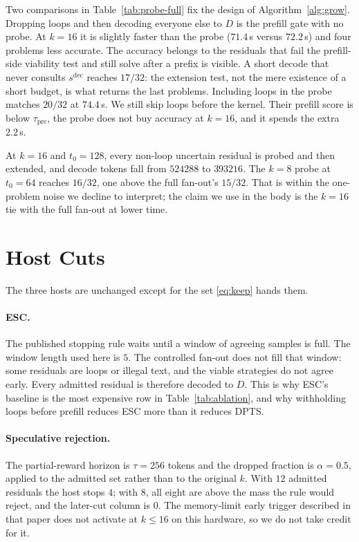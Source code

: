 Two comparisons in Table~\ref{tab:probe-full} fix the design of Algorithm~\ref{alg:grow}.
Dropping loops and then decoding everyone else to $D$ is the prefill gate with no probe.
At $k{=}16$ it is slightly faster than the probe ($71.4$\,s versus $72.2$\,s) and four problems less accurate.
The accuracy belongs to the residuals that fail the prefill-side viability test and still solve after a prefix is visible.
A short decode that never consults $s^{\mathrm{dec}}$ reaches $17/32$: the extension test, not the mere existence of a short budget, is what returns the last problems.
Including loops in the probe matches $20/32$ at $74.4$\,s.
We still skip loops before the kernel.
Their prefill score is below $\tau_{\mathrm{pre}}$, the probe does not buy accuracy at $k{=}16$, and it spends the extra $2.2$\,s.

At $k{=}16$ and $t_0{=}128$, every non-loop uncertain residual is probed and then extended, and decode tokens fall from $524288$ to $393216$.
The $k{=}8$ probe at $t_0{=}64$ reaches $16/32$, one above the full fan-out's $15/32$.
That is within the one-problem noise we decline to interpret; the claim we use in the body is the $k{=}16$ tie with the full fan-out at lower time.

\section{Host Cuts}
\label{app:hosts}

The three hosts are unchanged except for the set \eqref{eq:keep} hands them.

\paragraph{ESC.}
The published stopping rule waits until a window of agreeing samples is full.
The window length used here is $5$.
The controlled fan-out does not fill that window: some residuals are loops or illegal text, and the viable strategies do not agree early.
Every admitted residual is therefore decoded to $D$.
This is why ESC's baseline is the most expensive row in Table~\ref{tab:ablation}, and why withholding loops before prefill reduces ESC more than it reduces DPTS.

\paragraph{Speculative rejection.}
The partial-reward horizon is $\tau{=}256$ tokens and the dropped fraction is $\alpha{=}0.5$, applied to the admitted set rather than to the original $k$.
With $12$ admitted residuals the host stops $4$; with $8$, all eight are above the mass the rule would reject, and the later-cut column is $0$.
The memory-limit early trigger described in that paper does not activate at $k \le 16$ on this hardware, so we do not take credit for it.

